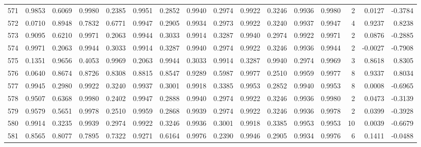 \begin{tabular}{lrrrrrrrrrrrrrrr}
571 &      0.9853 &  0.6069 &  0.9980 &  0.2385 &  0.9951 &  0.2852 &  0.9940 &  0.2974 &  0.9922 &  0.3246 &   0.9936 &     0.9980 &      2 &                    0.0127 &                    -0.3784 \\
572 &      0.0710 &  0.8948 &  0.7832 &  0.6771 &  0.9947 &  0.2905 &  0.9934 &  0.2973 &  0.9922 &  0.3240 &   0.9937 &     0.9947 &      4 &                    0.9237 &                     0.8238 \\
573 &      0.9095 &  0.6210 &  0.9971 &  0.2063 &  0.9944 &  0.3033 &  0.9914 &  0.3287 &  0.9940 &  0.2974 &   0.9922 &     0.9971 &      2 &                    0.0876 &                    -0.2885 \\
574 &      0.9971 &  0.2063 &  0.9944 &  0.3033 &  0.9914 &  0.3287 &  0.9940 &  0.2974 &  0.9922 &  0.3246 &   0.9936 &     0.9944 &      2 &                   -0.0027 &                    -0.7908 \\
575 &      0.1351 &  0.9656 &  0.4053 &  0.9969 &  0.2063 &  0.9944 &  0.3033 &  0.9914 &  0.3287 &  0.9940 &   0.2974 &     0.9969 &      3 &                    0.8618 &                     0.8305 \\
576 &      0.0640 &  0.8674 &  0.8726 &  0.8308 &  0.8815 &  0.8547 &  0.9289 &  0.5987 &  0.9977 &  0.2510 &   0.9959 &     0.9977 &      8 &                    0.9337 &                     0.8034 \\
577 &      0.9945 &  0.2980 &  0.9922 &  0.3240 &  0.9937 &  0.3001 &  0.9918 &  0.3385 &  0.9953 &  0.2852 &   0.9940 &     0.9953 &      8 &                    0.0008 &                    -0.6965 \\
578 &      0.9507 &  0.6368 &  0.9980 &  0.2402 &  0.9947 &  0.2888 &  0.9940 &  0.2974 &  0.9922 &  0.3246 &   0.9936 &     0.9980 &      2 &                    0.0473 &                    -0.3139 \\
579 &      0.9579 &  0.5651 &  0.9978 &  0.2510 &  0.9959 &  0.2868 &  0.9939 &  0.2974 &  0.9922 &  0.3246 &   0.9936 &     0.9978 &      2 &                    0.0399 &                    -0.3928 \\
580 &      0.9914 &  0.3235 &  0.9939 &  0.2974 &  0.9922 &  0.3246 &  0.9936 &  0.3001 &  0.9918 &  0.3385 &   0.9953 &     0.9953 &     10 &                    0.0039 &                    -0.6679 \\
581 &      0.8565 &  0.8077 &  0.7895 &  0.7322 &  0.9271 &  0.6164 &  0.9976 &  0.2390 &  0.9946 &  0.2905 &   0.9934 &     0.9976 &      6 &                    0.1411 &                    -0.0488 \\

\end{tabular}
